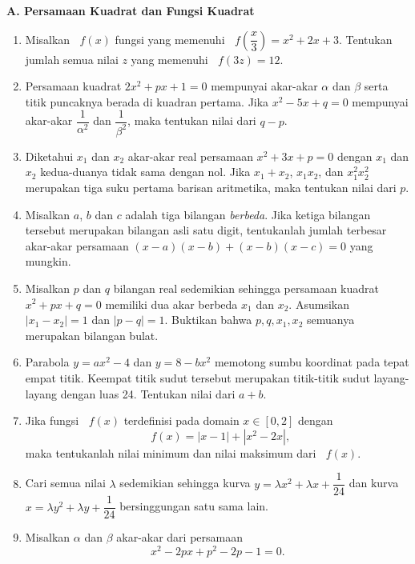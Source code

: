 \documentclass[12pt]{article}
\newcommand*\func[2]{\mathop{}\!{#1}{\left({#2}\right)}}
\begin{document}
	\noindent \textbf{A. Persamaan Kuadrat dan Fungsi Kuadrat}
	\begin{enumerate}[leftmargin=*]
		\item Misalkan $ \func{f}{x} $ fungsi yang memenuhi $ \func{f}{\dfrac{x}{3}} = x^{2} + 2x + 3 $. Tentukan jumlah semua nilai $ z $ yang memenuhi $ \func{f}{3z} = 12 $.
		\item Persamaan kuadrat $ 2x^{2} + px + 1 = 0 $ mempunyai akar-akar $ \alpha $ dan $ \beta $ serta titik puncaknya berada di kuadran pertama. Jika $ x^{2} - 5x + q = 0 $ mempunyai akar-akar $ \dfrac{1}{\alpha^{2}} $ dan $ \dfrac{1}{\beta^{2}} $, maka tentukan nilai dari $ q - p $.
		\item Diketahui $ x_{1} $ dan $ x_{2} $ akar-akar real persamaan $ x^{2} + 3x + p = 0 $ dengan $ x_{1} $ dan $ x_{2} $ kedua-duanya tidak sama dengan nol. Jika $ x_{1} + x_{2} $, $ x_{1}x_{2} $, dan $ x_{1}^{2}x_{2}^{2} $ merupakan tiga suku pertama barisan aritmetika, maka tentukan nilai dari $ p $.
		\item Misalkan $ a $, $ b $ dan $ c $ adalah tiga bilangan \textit{berbeda}. Jika ketiga bilangan tersebut merupakan bilangan asli satu digit, tentukanlah jumlah terbesar akar-akar persamaan $ \left(x - a\right)\left(x- b\right) + \left(x - b\right)\left(x - c\right) = 0 $ yang mungkin.
		\item Misalkan $ p $ dan $ q $ bilangan real sedemikian sehingga persamaan kuadrat $ x^{2} + px + q = 0 $ memiliki dua akar berbeda $ x_{1} $ dan $ x_{2} $. Asumsikan $ \left|x_{1} - x_{2}\right| = 1 $ dan $ \left|p - q\right| = 1 $. Buktikan bahwa $ p, q, x_{1}, x_{2} $ semuanya merupakan bilangan bulat.
		\item Parabola $ y = ax^{2} - 4 $ dan $ y = 8 - bx^{2} $ memotong sumbu koordinat pada tepat empat titik. Keempat titik sudut tersebut merupakan titik-titik sudut layang-layang dengan luas 24. Tentukan nilai dari $ a + b $.
		\item Jika fungsi $ \func{f}{x} $ terdefinisi pada domain $ x \in \left[0, 2\right] $ dengan
		\[ \func{f}{x} = \left|x - 1\right| + \left|x^{2} - 2x\right|, \]
		maka tentukanlah nilai minimum dan nilai maksimum dari $ \func{f}{x} $.
		\item Cari semua nilai $ \lambda $ sedemikian sehingga kurva $ y = \lambda x^{2} + \lambda x + \dfrac{1}{24} $ dan kurva $ x = \lambda y^{2} + \lambda y + \dfrac{1}{24} $ bersinggungan satu sama lain.
		\item Misalkan $ \alpha $ dan $ \beta $ akar-akar dari persamaan
		\[ x^{2} - 2px + p^{2} - 2p - 1 = 0. \]

\end{enumerate}
\end{document}
